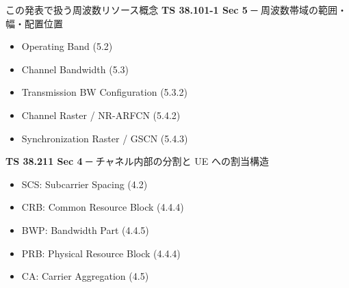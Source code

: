 \begin{frame}{この発表で扱う周波数リソース概念}
\textbf{TS 38.101-1 Sec 5} ─ 周波数帯域の範囲・幅・配置位置
\begin{itemize}
  \item Operating Band (5.2)
  \item Channel Bandwidth (5.3)
  \item Transmission BW Configuration (5.3.2)
  \item Channel Raster / NR-ARFCN (5.4.2)
  \item Synchronization Raster / GSCN (5.4.3)
\end{itemize}

\textbf{TS 38.211 Sec 4} ─ チャネル内部の分割と UE への割当構造
\begin{itemize}
  \item SCS: Subcarrier Spacing (4.2)
  \item CRB: Common Resource Block (4.4.4)
  \item BWP: Bandwidth Part (4.4.5)
  \item PRB: Physical Resource Block (4.4.4)
  \item CA: Carrier Aggregation (4.5)
\end{itemize}
\end{frame}
